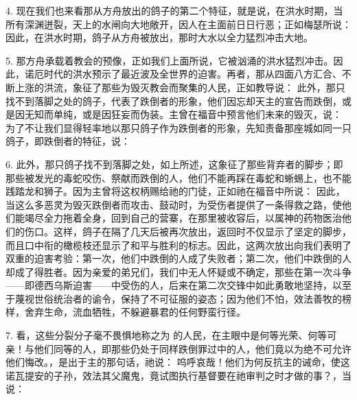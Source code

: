 4. 现在我们也来看那从方舟放出的鸽子的第二个特征，就是说，在洪水时期，当所有深渊迸裂，天上的水闸向大地敞开，因人在主面前日日行恶；正如梅瑟所说：  因此，在洪水时期，鸽子从方舟被放出，那时大水以全力猛烈冲击大地。\par

5. 那方舟承载着教会的预像，正如我们上面所说，它被汹涌的洪水猛烈冲击。因此，诺厄时代的洪水预示了最近波及全世界的迫害。再者，那从四面八方汇合、不断上涨的洪流，象征了那些为毁灭教会而聚集的人民，正如教导说：  此外，那只找不到落脚之处的鸽子，代表了跌倒者的形象，他们因忘却天主的宣告而跌倒，或是因无知而单纯，或是因狂妄而伪装。主曾在福音中预言他们未来的毁灭，说：  为了不让我们显得轻率地以那只鸽子作为跌倒者的形象，先知责备那座城如同一只鸽子，即跌倒者的特征，说：\par

6. 此外，那只鸽子找不到落脚之处，如上所述，这象征了那些背弃者的脚步；即那些被发光的毒蛇咬伤、祭献而跌倒的人，他们不能再踩在毒蛇和蜥蜴上，也不能践踏龙和狮子。因为主曾将这权柄赐给祂的门徒，正如祂在福音中所说：  因此，当这么多恶灵为毁灭跌倒者而攻击、鼓动时，为受伤者提供了一条得救之路，使他们能竭尽全力拖着全身，回到自己的营寨，在那里被收容后，以属神的药物医治他们的伤口。这样，鸽子在隔了几天后被再次放出，返回时不仅显示了坚定的脚步，而且口中衔的橄榄枝还显示了和平与胜利的标志。因此，这两次放出向我们表明了双重的迫害考验：第一次，他们中跌倒的人成了失败者；第二次，他们中跌倒的人却成了得胜者。因为亲爱的弟兄们，我们中无人怀疑或不确定，那些在第一次斗争——即德西乌斯迫害——中受伤的人，后来在第二次交锋中如此勇敢地坚持，以至于蔑视世俗统治者的谕令，保持了不可征服的姿态；因为他们不怕，效法善牧的榜样，舍弃生命，流血牺牲，不躲避暴君的任何野蛮行径。\par

7. 看，这些分裂分子毫不畏惧地称之为  的人民，在主眼中是何等光荣、何等可亲！与他们同等的人，即那些仍处于同样跌倒罪过中的人，他们竟以为绝不可允许他们悔改。，是出于主的那句话，祂说：  呜呼哀哉！他们为何反抗主的诫命，使这诺瓦提安的子孙，效法其父魔鬼，竟试图执行基督要在祂审判之时才做的事？，当说： \par


